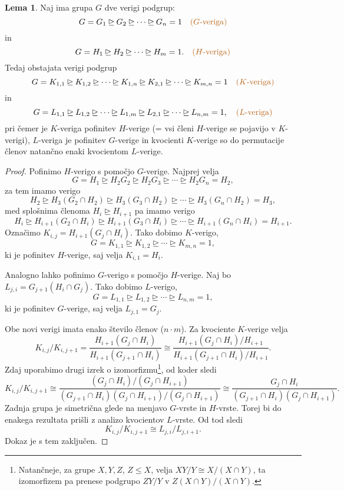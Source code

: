 \documentclass[11pt]{book}
\def\vprasanje{\color{oranzna}}
\theoremstyle{definition}
\theoremstyle{zgled}
\theoremstyle{odprtproblem}
\theoremstyle{domacanaloga}
\newenvironment{dokaz}
    {\color{siva}\begin{proof}}
    {\end{proof}}
\theoremstyle{izrek}
\newtheorem*{lema}{Lema}
\begin{document}
\begin{lema}
Naj ima grupa $G$ dve verigi podgrup:
\[
G = G_1 \unrhd G_2 \unrhd \cdots \unrhd G_n = 1 \quad \text{\vprasanje ($G$-veriga)}
\]
in
\[
G = H_1 \unrhd H_2 \unrhd \cdots \unrhd H_m = 1. \quad \text{\vprasanje ($H$-veriga)}
\]
Tedaj obstajata verigi podgrup
\[
G = K_{1,1} \unrhd K_{1,2} \unrhd \cdots \unrhd K_{1,n} \unrhd K_{2,1} \unrhd \cdots \unrhd K_{m,n} = 1 \quad \text{\vprasanje ($K$-veriga)}
\]
in
\[
G = L_{1,1} \unrhd L_{1,2} \unrhd \cdots \unrhd L_{1,m} \unrhd L_{2,1} \unrhd \cdots \unrhd L_{n,m} = 1, \quad \text{\vprasanje ($L$-veriga)}
\]
pri čemer je $K$-veriga pofinitev $H$-verige (= vsi členi $H$-verige se pojavijo v $K$-verigi), $L$-veriga je pofinitev $G$-verige in kvocienti $K$-verige so do permutacije členov natančno enaki kvocientom $L$-verige. 
\end{lema}

\begin{dokaz}
Pofinimo $H$-verigo s pomočjo $G$-verige. Najprej velja
\[
G = H_1 \unrhd H_2 G_2 \unrhd H_2 G_3 \unrhd \cdots \unrhd H_2 G_n = H_2,
\]
za tem imamo verigo
\[
H_2 \unrhd H_3 (G_2 \cap H_2) \unrhd H_3 (G_3 \cap H_2) \unrhd \cdots \unrhd H_3 (G_n \cap H_2) = H_3,
\]
med splošnima členoma $H_i \unrhd H_{i+1}$ pa imamo verigo
\[
H_i \unrhd H_{i+1}(G_2 \cap H_i) \unrhd H_{i+1}(G_3 \cap H_i) \unrhd \cdots \unrhd H_{i+1}(G_n \cap H_i) = H_{i+1}.
\]
Označimo $K_{i,j} = H_{i+1}(G_j \cap H_i)$. Tako dobimo $K$-verigo,
\[
G = K_{1,1} \unrhd K_{1,2} \unrhd \cdots \unrhd K_{m,n} = 1,
\]
ki je pofinitev $H$-verige, saj velja $K_{i,1} = H_i$.

Analogno lahko pofinimo $G$-verigo s pomočjo $H$-verige. Naj bo $L_{j,i} = G_{j+1}(H_i \cap G_j)$. Tako dobimo $L$-verigo,
\[
G = L_{1,1} \unrhd L_{1,2} \unrhd \cdots \unrhd L_{n,m} = 1,
\]
ki je pofinitev $G$-verige, saj velja $L_{j,1} = G_j$.

Obe novi verigi imata enako število členov ($n\cdot m$). Za kvociente $K$-verige velja
\[
K_{i,j}/K_{i,j+1} = \frac{H_{i+1}(G_j \cap H_i)}{H_{i+1}(G_{j+1} \cap H_i)} \cong \frac{H_{i+1}(G_j \cap H_i) / H_{i+1}}{H_{i+1}(G_{j+1} \cap H_i) / H_{i+1}}.
\]
Zdaj uporabimo drugi izrek o izomorfizmu\footnote{Natančneje, za grupe $X,Y,Z$, $Z \leq X$, velja $XY/Y \cong X/(X \cap Y)$, ta izomorfizem pa prenese podgrupo $ZY/Y$ v $Z(X \cap Y)/(X \cap Y)$.}, od koder sledi
\[
K_{i,j}/K_{i,j+1} \cong \frac{(G_j \cap H_i) / (G_j \cap H_{i+1})}{(G_{j+1} \cap H_i) (G_j \cap H_{i+1}) / (G_j \cap H_{i+1})}
\cong \frac{G_j \cap H_i}{(G_{j+1} \cap H_i) (G_j \cap H_{i+1})}.
\]
Zadnja grupa je simetrična glede na menjavo $G$-vrste in $H$-vrste. Torej bi do enakega rezultata prišli z analizo kvocientov $L$-vrste. Od tod sledi
\[
K_{i,j}/K_{i,j+1} \cong L_{j,i} / L_{j, i + 1}.
\]
Dokaz je s tem zaključen.
\end{dokaz}
\end{document}
